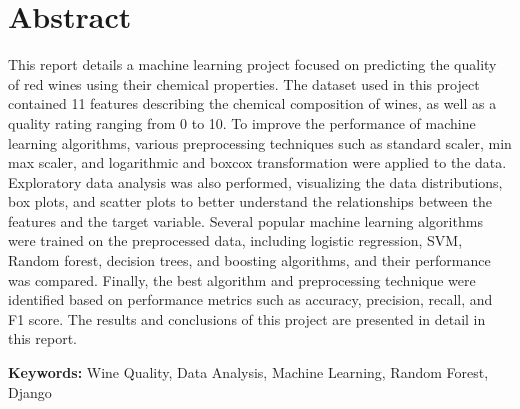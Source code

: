\chapter{Abstract}
This report details a machine learning project focused on predicting the quality of red wines using their chemical properties. The dataset used in this project contained 11 features describing the chemical composition of wines, as well as a quality rating ranging from 0 to 10. To improve the performance of machine learning algorithms, various preprocessing techniques such as standard scaler, min max scaler, and logarithmic and boxcox transformation were applied to the data. Exploratory data analysis was also performed, visualizing the data distributions, box plots, and scatter plots to better understand the relationships between the features and the target variable. Several popular machine learning algorithms were trained on the preprocessed data, including logistic regression, SVM, Random forest, decision trees, and boosting algorithms, and their performance was compared. Finally, the best algorithm and preprocessing technique were identified based on performance metrics such as accuracy, precision, recall, and F1 score. The results and conclusions of this project are presented in detail in this report.

\textbf{Keywords:} Wine Quality, Data Analysis, Machine Learning, Random Forest, Django






